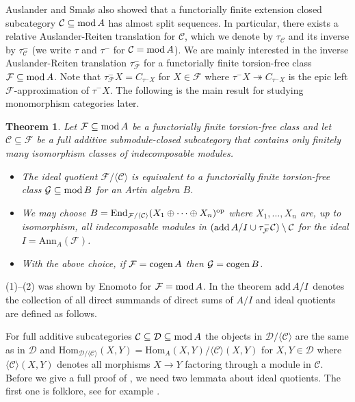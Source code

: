 \documentclass[a4paper]{amsart}
\newcommand{\op}{\textnormal{op}}
\renewcommand{\mod}{\textnormal{mod}\,}
\newcommand{\add}{\textnormal{add}\,}
\newcommand{\cogen}{\textnormal{cogen}\,}
\numberwithin{equation}{section} \theoremstyle{plain}
\newtheorem{thm}{Theorem}
\numberwithin{thm}{section}
\begin{document}
Auslander and Smal{\o} \cite{ASm2} also showed that a functorially finite extension closed subcategory $\mathcal{C} \subseteq \mod A$ has almost split sequences. In particular, there exists a relative Auslander-Reiten translation for $\mathcal{C}$, which we denote by $\tau_\mathcal{C}$ and its inverse by $\tau^-_\mathcal{C}$ (we write $\tau$ and $\tau^-$ for $\mathcal{C} = \mod A$). We are mainly interested in the inverse Auslander-Reiten translation $\tau^-_\mathcal{F}$ for a functorially finite torsion-free class $\mathcal{F}\subseteq \mod A$. Note that $\tau^-_\mathcal{F} X = C_{\tau^-X}$ for $X\in\mathcal{F}$ where $\tau^- X \twoheadrightarrow C_{\tau^-X}$ is the epic left $\mathcal{F}$-approximation of $\tau^- X$. The following is the main result for studying monomorphism categories later. 

\begin{thm}\label{T: main} Let $\mathcal{F} \subseteq \mod A$ be a functorially finite torsion-free class and let $\mathcal{C} \subseteq \mathcal{F}$ be a full additive submodule-closed subcategory that contains only finitely many isomorphism classes of indecomposable modules. 
\begin{itemize}
    \item[(1)] The ideal quotient $\mathcal{F}/ \langle \mathcal{C} \rangle$ is equivalent to a functorially finite torsion-free class $\mathcal{G} \subseteq \mod B$ for an Artin algebra $B$.
    \item[(2)] We may choose $B = \mathrm{End}_{\mathcal{F}/\langle \mathcal{C}\rangle}(X_1 \oplus \dots \oplus X_n)^\op$ where $X_1, \dots , X_n$ are, up to isomorphism, all indecomposable modules in $(\add A/I \cup \tau_\mathcal{F}^- \mathcal{C}) \setminus \mathcal{C}$ for the ideal $I = \mathrm{Ann}_A(\mathcal{F})$.  
    \item[(3)] With the above choice, if $\mathcal{F} = \cogen A$ then $\mathcal{G} = \cogen B$.
\end{itemize}
\end{thm}

 (1)--(2) was shown by Enomoto \cite[Theorem 5.1]{enomoto} for $\mathcal{F} = \mod A$. In the theorem $\add A/I$ denotes the collection of all direct summands of direct sums of $A/I$ and ideal quotients are defined as follows. 

For full additive subcategories $\mathcal{C}\subseteq \mathcal{D} \subseteq \mod A$ the objects in $\mathcal{D}/ \langle \mathcal{C} \rangle$ are the same as in $\mathcal{D}$ and $\mathrm{Hom}_{\mathcal{D}/\langle \mathcal{C} \rangle} (X,Y) = \mathrm{Hom}_A(X,Y)/\langle \mathcal{C} \rangle (X,Y)$ for $X,Y \in \mathcal{D}$ where $\langle \mathcal{C} \rangle (X,Y)$ denotes all morphisms $X\to Y$ factoring through a module in $\mathcal{C}$. Before we give a full proof of , we need two lemmata about ideal quotients. The first one is folklore, see for example \cite[Lemma 1.1]{jorgensen}.
\end{document}

